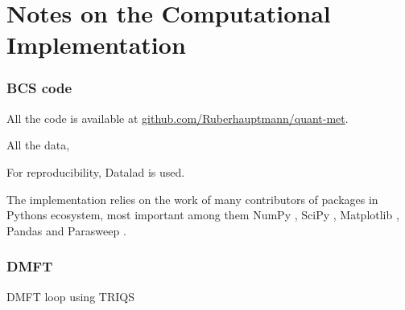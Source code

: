 \documentclass[../notes.tex]{subfiles}
\begin{document}
\raggedbottom
	
\chapter{Notes on the Computational Implementation}

\subsection*{BCS code}

All the code is available at \href{https://github.com/Ruberhauptmann/quant-met}{github.com/Ruberhauptmann/quant-met}.

All the data, 

For reproducibility, Datalad \cite{halchenkoDataLadDistributedSystem2021} is used.

The implementation relies on the work of many contributors of packages in Pythons ecosystem, most important among them NumPy \cite{harrisArrayProgrammingNumPy2020}, SciPy \cite{virtanenSciPy10Fundamental2020}, Matplotlib \cite{hunterMatplotlib2DGraphics2007}, Pandas \cite{mckinneyDataStructuresStatistical2010, thepandasdevelopmentteamPandasdevPandasPandas2024} and Parasweep \cite{bachParasweepTemplatebasedUtility2021}.

\subsection*{DMFT}

DMFT loop using TRIQS \cite{parcolletTRIQSToolboxResearch2015}
\end{document}
